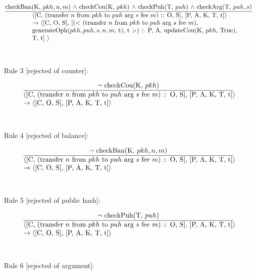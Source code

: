 \documentclass[a4paper]{llncs}
\begin{document}
\begin{equation}{}
\frac{\text{checkBan(K, $pkh, n, m$) $\wedge$ checkCou(K, $pkh$) $\wedge$ checkPuh(T, $puh$)}
\\
\text{ $\wedge$ checkArg(T, $puh, s$)}}{\parbox{4.2in}{\text{$\langle$[C, (transfer ${n}$ from ${pkh}$ to  ${puh}$ arg ${s}$ fee ${m}$) :: O, S], [P, A, K, T, t]$\rangle$}\\
\text{$\rightarrow$  $\langle$[C, O, S], [($<$ (transfer ${n}$ from ${pkh}$ to  ${puh}$ arg ${s}$ fee ${m}$), }\\
 \text{generateOph($pkh, puh, s, n, m$, t), t $>$) :: P, A, updateCou(K, $pkh$, True), }\\
\text{T, t] $\rangle$}}} 
\end{equation}
~\\
~\\
Rule 3 [rejected of counter]:

\begin{equation}{}
\frac{\text{$\neg$ checkCou(K, $pkh$)}}{\parbox{4.2in}{\text{$\langle$[C, (transfer ${n}$ from ${pkh}$ to  ${puh}$ arg ${s}$ fee ${m}$) :: O, S], [P, A, K, T, t]$\rangle$  }\\
\text{$\rightarrow \langle$[C, O, S], [P, A, K, T, t]$\rangle$}}} 
\end{equation}
~\\
~\\
Rule 4 [rejected of balance]:

\begin{equation}{}
\frac{\text{$\neg$ checkBan(K, $pkh, n, m$)}}{\parbox{4.2in}{\text{$\langle$[C, (transfer ${n}$ from ${pkh}$ to  ${puh}$ arg ${s}$ fee ${m}$) :: O, S], [P, A, K, T, t]$\rangle$ }\\
\text{$\rightarrow \langle$[C, O, S], [P, A, K, T, t]$\rangle$}}} 
\end{equation}
~\\
~\\
Rule 5 [rejected of public hash]:

\begin{equation}{}
\frac{\text{$\neg$ checkPuh(T, $puh$)}}{\parbox{4.2in}{\text{$\langle$[C, (transfer ${n}$ from ${pkh}$ to  ${puh}$ arg ${s}$ fee ${m}$) :: O, S], [P, A, K, T, t]$\rangle$ }\\
\text{$\rightarrow \langle$[C, O, S], [P, A, K, T, t]$\rangle$}}} 
\end{equation}
~\\
~\\
Rule 6 [rejected of argument]:
\end{document}
